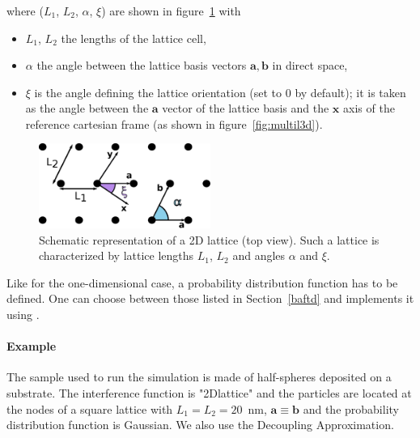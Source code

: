 \FloatBarrier

\newpage
\subsubsection{  } 
where ($L_1$, $L_2$, $\alpha$, $\xi$) are shown in figure~\ref{fig:2dlattice} with 
\begin{itemize}
\item[]$L_1$, $L_2$ the lengths of the lattice cell, 
\item[]$\alpha$ the angle between the lattice basis vectors $\mathbf{a}, \mathbf{b}$ in direct space,
\item[] $\xi$ is the angle defining the lattice orientation (set to $0$ by default); it is taken as the angle between the $\mathbf{a}$ vector of the lattice basis and the $\mathbf{x}$ axis of the reference cartesian frame (as shown in figure~\ref{fig:multil3d}).
\end{itemize}

\begin{figure}[ht]
\begin{center}
\includegraphics[width=0.5\textwidth]{Figures/drawing/2Dlattice.eps}
\end{center}
\caption{Schematic representation of a 2D lattice (top view). Such a lattice is characterized by lattice lengths $L_1$, $L_2$ and angles $\alpha$ and $\xi$.}
\label{fig:2dlattice}
\end{figure}

Like for the one-dimensional case, a probability distribution function  has to be defined. One can choose between those listed in Section~\ref{baftd} and implements it using .

\paragraph{Example} The sample used to run the simulation is made of half-spheres deposited on a substrate. The interference function is "2Dlattice" and the particles are located at the nodes of a square lattice with $L_1=L_2=20$~nm, $\mathbf{a}\equiv \mathbf{b}$ and the probability distribution function is Gaussian. We also use the Decoupling Approximation. 

